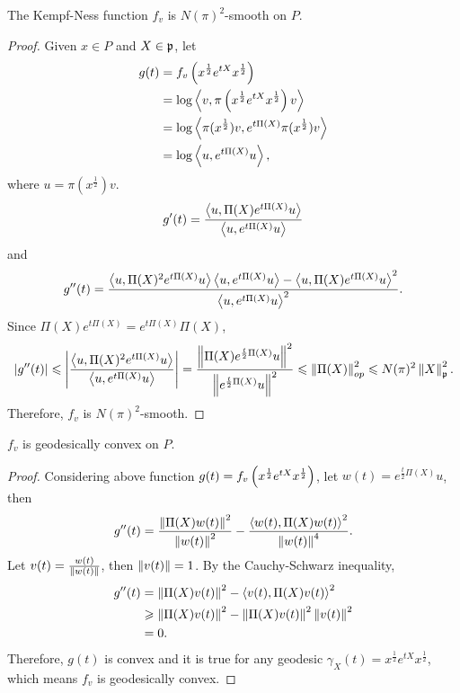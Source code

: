 \documentclass[suri,pdfbookmark]{engsuribt} %
\begin{document}
  \begin{thm}\label{thm:2}
    The Kempf-Ness function $f_v$ is $N(\pi)^2$-smooth on $P$.
  \end{thm}
  \begin{proof}
    Given $x\in P$ and $X \in \mathfrak{p}$, let
    \begin{equation*}
      \begin{split}
        g(t) &= f_v\left(x^{\frac{1}{2}}e^{tX}x^{\frac{1}{2}}\right) \\
        &= \log \left\langle v, \pi\left(x^{\frac{1}{2}}e^{tX}x^{\frac{1}{2}}\right)v \right\rangle \\
        &= \log \left\langle \pi(x^{\frac{1}{2}})v,e^{t\Pi(X)}\pi(x^{\frac{1}{2}})v \right\rangle \\
        &= \log \left\langle u,e^{t\Pi(X)}u \right\rangle,
      \end{split}
    \end{equation*}
    where $u = \pi(x^{\frac{1}{2}})v$.
    \begin{equation*}
      g^{\prime}(t) = \frac{\left\langle u,\Pi(X)e^{t\Pi(X)}u \right\rangle}{\left\langle u,e^{t\Pi(X)}u \right\rangle}
    \end{equation*}
    and
    \begin{equation*}
      g^{\prime\prime}(t) = \frac{\left\langle u,\Pi(X)^2e^{t\Pi(X)}u \right\rangle\left\langle u,e^{t\Pi(X)}u \right\rangle - \left\langle u,\Pi(X)e^{t\Pi(X)}u \right\rangle^2}{\left\langle u,e^{t\Pi(X)}u \right\rangle^2}.
    \end{equation*}
    Since $\Pi(X)e^{t\Pi(X)} = e^{t\Pi(X)}\Pi(X)$,
    \begin{equation*}
      \left\lvert g^{\prime\prime}(t)\right\lvert \leqslant \left\lvert\frac{\left\langle u,\Pi(X)^2e^{t\Pi(X)}u \right\rangle}{\left\langle u,e^{t\Pi(X)}u \right\rangle}\right\lvert = \frac{\left\lVert\Pi(X)e^{\frac{t}{2}\Pi(X)}u\right\lVert^2}{\left\lVert e^{\frac{t}{2}\Pi(X)}u\right\lVert^2} \leqslant \left\lVert\Pi(X)\right\lVert^2_{op} \leqslant N(\pi)^2 \left\lVert X\right\lVert^2_{\mathfrak{p}}.
    \end{equation*}
    Therefore, $f_v$ is $N(\pi)^2$-smooth.
  \end{proof}

  \begin{cor}
    $f_v$ is geodesically convex on $P$.
  \end{cor}
  \begin{proof}
    Considering above function $g(t) = f_v\left(x^{\frac{1}{2}}e^{tX}x^{\frac{1}{2}}\right)$, let $w(t) = e^{\frac{t}{2}\Pi(X)}u$, then
    \begin{equation*}
      g^{\prime\prime}(t) = \frac{\left\lVert\Pi(X)w(t)\right\lVert^2}{\left\lVert w(t)\right\lVert^2}-\frac{\left\langle w(t),\Pi(X)w(t) \right\rangle^2}{\left\lVert w(t)\right\lVert^4}.
    \end{equation*}
    Let $v(t)= \frac{w(t)}{\left\lVert w(t)\right\lVert}$, then $\left\lVert v(t)\right\lVert = 1$. By the Cauchy-Schwarz inequality,
    \begin{equation*}
      \begin{split}
        g^{\prime\prime}(t) &= \left\lVert\Pi(X)v(t)\right\lVert^2 - \left\langle v(t),\Pi(X)v(t) \right\rangle^2 \\
        &\geqslant \left\lVert\Pi(X)v(t)\right\lVert^2 - \left\lVert\Pi(X)v(t)\right\lVert^2\left\lVert v(t)\right\lVert^2 \\
        &= 0.
      \end{split} 
    \end{equation*}
    Therefore, $g(t)$ is convex and it is true for any geodesic $\gamma_X(t)=  x^{\frac{1}{2}}e^{tX}x^{\frac{1}{2}}$, which means $f_v$ is geodesically convex.
  \end{proof}
\end{document}
